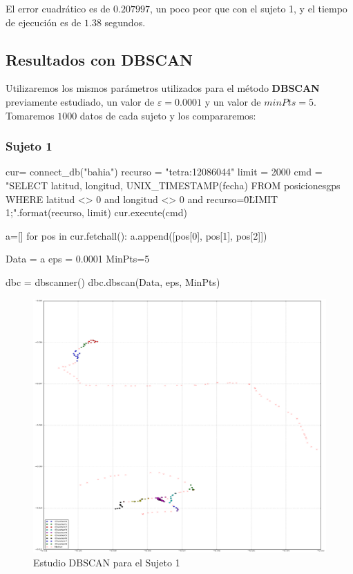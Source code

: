 \documentclass[a4paper, 12pt]{article}
\begin{document}
El error cuadr\'atico es de $0.207997$, un poco peor que con el sujeto 1, y el tiempo de ejecuci\'on es de $1.38$ segundos.\\

\subsection{Resultados con DBSCAN}

Utilizaremos los mismos par\'ametros utilizados para el m\'etodo \textbf{DBSCAN} previamente estudiado, un valor de $\varepsilon = 0.0001$ y un valor de $minPts = 5$. Tomaremos $1000$ datos de cada sujeto y los compararemos:\\

\subsubsection{Sujeto 1}

\begin{python}
cur= connect_db("bahia")
recurso = "tetra:12086044"
limit = 2000
cmd = "SELECT latitud, longitud, UNIX_TIMESTAMP(fecha) 
	FROM posicionesgps 
	WHERE latitud <> 0 and longitud <> 0 and recurso=\"{0}\" 
	LIMIT {1};".format(recurso, limit)
cur.execute(cmd)

a=[]
for pos in cur.fetchall():
    a.append([pos[0], pos[1], pos[2]])

Data = a
eps = 0.0001
MinPts=5

dbc = dbscanner()
dbc.dbscan(Data, eps, MinPts)
\end{python}

\begin{figure}[H]
	\includegraphics[width=15cm]{../comparativa/dbscanSujeto1.png}
	\caption{Estudio DBSCAN para el Sujeto 1}
\end{figure}
\end{document}
